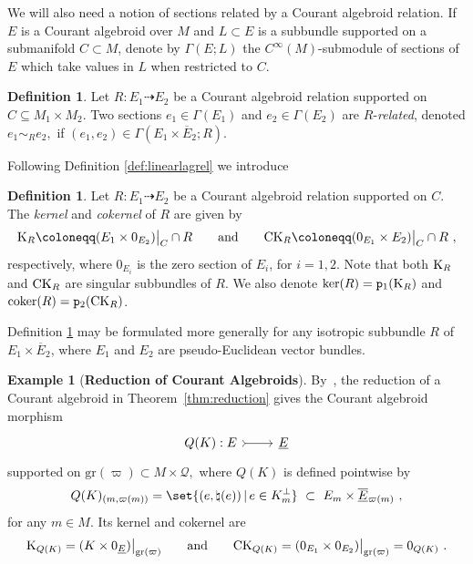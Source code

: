 \documentclass[a4paper, reqno, 11pt]{amsart}
\numberwithin{equation}{section}
\theoremstyle{definition}
\newtheorem{definition}[equation]{Definition}
\newtheorem{example}[equation]{Example}
\newcommand{\red}[1]{\underline{#1}}
\newcommand{\rmp}{\mathtt{p}}
\newcommand{\cQ}{{\mathcal Q}}
\newcommand{\sfGamma}{{\mathsf{\Gamma}}}
\newcommand{\gr}{\text{gr}}
\newcommand{\rel}{\dashrightarrow}
\theoremstyle{remark}
\begin{document}
We will also need a notion of sections related by a Courant algebroid relation. If $E$ is a Courant algebroid over $M$ and $L\subset E$ is a subbundle supported on a submanifold $C\subset M$, denote by $\sfGamma(E; L)$ the $C^\infty(M)$-submodule of sections of $E$ which take values in $L$ when restricted to $C$.

\begin{definition}
 Let $R \colon E_1 \dashrightarrow E_2$ be a Courant algebroid relation supported on $C\subseteq M_1\times M_2$. Two sections $e_1 \in \mathsf{\Gamma}(E_1)$ and $e_2 \in \mathsf{\Gamma}(E_2)$ are $R$-\emph{related}, denoted $e_1 \sim_R e_2,$ if $(e_1, e_2) \in \mathsf{\Gamma}(E_1 \times \overline{E}_2 ; R).$ 
\end{definition}

Following Definition \ref{def:linearlagrel} we introduce

\begin{definition} \label{def:kerandcoker}
Let $R \colon E_1 \rel E_2$ be a Courant algebroid relation supported on $C$. The \emph{kernel} and \emph{cokernel} of $R$ are given by
    \begin{align}
        {\rm K}_R \coloneqq (E_1 \times 0_{E_2})\big\rvert_C \cap R \qquad \text{and} \qquad
        {\rm CK}_R \coloneqq (0_{E_1} \times E_2) \big\rvert_C \cap R \ ,
    \end{align}
    respectively, where $0_{E_i}$ is the zero section of $E_i$, for $i=1,2$. Note that both ${\rm K}_R$ and ${\rm CK}_R$ are singular subbundles of $R$. We also denote $\ker(R) = \rmp_1({\rm K}_R)$ and ${\rm coker}(R) = \rmp_2({\rm CK}_R)$. 
\end{definition}

Definition \ref{def:kerandcoker} may be formulated more generally for any isotropic subbundle $R$ of $E_1 \times \overline{E}_2$, where $E_1$ and $E_2$ are pseudo-Euclidean vector bundles.

\begin{example}[\textbf{Reduction of Courant Algebroids}] \label{eg:reductionCArel}
By~\cite[Proposition 3.7]{DeFraja:2023fhe}, the reduction of a Courant algebroid in Theorem~\ref{thm:reduction}
gives the Courant algebroid morphism 
\begin{equation}
\begin{tikzcd}
Q(K):E \ar[r, rightarrowtail] & \red E
\end{tikzcd}
\end{equation}
supported on $\gr(\varpi) \subset M \times \cQ,$
where $Q(K)$ is defined pointwise by
    \begin{align}  Q(K)_{(m,\varpi(m))}=\set{(e,\natural(e))\, | \,  e\in K^\perp_m} \ \subset \ E_m\times \red{\overline{E}}{}_{\varpi(m)} \ ,
\end{align}
for any $m \in M.$ Its kernel and cokernel are $${\rm K}_{Q(K)} = (K \times 0_{\red E}) \big\rvert_{\gr(\varpi)} \qquad  \text{and} \qquad {\rm CK}_{Q(K)} = (0_{E_1}\times 0_{E_2}) \big\rvert_{\gr(\varpi)}=0_{Q(K)} \ . $$
\end{example}
\end{document}
